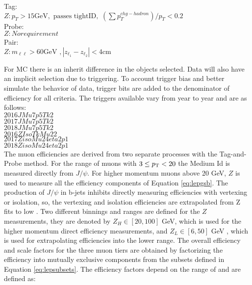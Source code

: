 Tag:\\
$Z: p_T>15 \text{GeV}, \, \, \text{passes tightID}, \, \, (\sum p_T^{chg-hadron})/p_T < 0.2$\\
Probe:\\
$Z: No requirement$\\
Pair:\\
$Z: m_{\ell\ell} > 60 \text{GeV} \, \, , |z_{\ell_1} - z_{\ell_2}| < 4 \text{cm}$



For MC there is an inherit difference in the objects selected. Data will also have an implicit selection due to triggering. To account trigger bias and better simulate the behavior of data, trigger bits are added to the denominator of efficiency for all criteria. The triggers available vary from year to year and are as follows:\\

$2016 J Mu7p5Tk2$\\
$2017 J Mu7p5Tk2$\\
$2018 J Mu7p5Tk2$\\
$2016 Z IsoTkMu22$\\
$2017 Z isoMu24eta2p1$\\
$2018 Z isoMu24eta2p1$\\


The muon efficiencies are derived from two separate processes with the Tag-and-Probe method. For the range of muons with $3 \leq p_{\mathrm{T}} < 20$ the Medium Id is measured directly from $J/\psi$. For higher momentum muons above 20 GeV, $Z$ is used to measure all the efficiency components of Equation \ref{eq:lepgsb}. The production of $J/\psi$ in  b-jets inhibits directly measuring efficiencies with vertexing or isolation, so, the vertexing and isolation efficiencies are extrapolated from Z fits to low \pt. Two different binnings and ranges are defined for the $Z$ measurements, they are denoted by $Z_H \in [20,100]$ GeV, which is used for the higher momentum direct efficiency measurements, and $Z_L \in [6,50]$ GeV , which is used for extrapolating efficiencies into the lower \pt range. The overall efficiency and scale factors for the three muon tiers are obtained by factorizing the efficiency into mutually exclusive components from the subsets defined in Equation \ref{eq:lepsubsets}. The efficiency factors depend on the range of \pt and are defined as:


